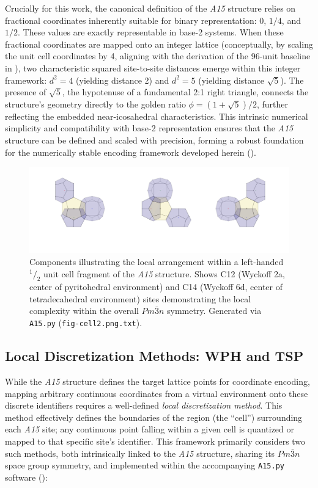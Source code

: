 \documentclass[10pt]{article}
\def\AAAB{\textit{A15}}
\begin{document}
Crucially for this work, the canonical definition of the \AAAB{} structure relies on fractional coordinates inherently suitable for binary representation: $0$, $1/4$, and $1/2$. These values are exactly representable in base-2 systems. When these fractional coordinates are mapped onto an integer lattice (conceptually, by scaling the unit cell coordinates by 4, aligning with the derivation of the 96-unit baseline in ), two characteristic squared site-to-site distances emerge within this integer framework: $d^2 = 4$ (yielding distance 2) and $d^2 = 5$ (yielding distance $\sqrt{5}$). The presence of $\sqrt{5}$, the hypotenuse of a fundamental 2:1 right triangle, connects the structure's geometry directly to the golden ratio $\phi = (1+\sqrt{5})/2$, further reflecting the embedded near-icosahedral characteristics. This intrinsic numerical simplicity and compatibility with base-2 representation ensures that the \AAAB{} structure can be defined and scaled with precision, forming a robust foundation for the numerically stable encoding framework developed herein ().

\begin{figure}[!ht]
    \capstart
    \centering
    \includegraphics[trim={25 50 25 0}, scale=0.55]{fig-cell2}
    \caption{Components illustrating the local arrangement within a left-handed $^1/_2$ unit cell fragment of the \AAAB{} structure. Shows C12 (Wyckoff 2a, center of pyritohedral environment) and C14 (Wyckoff 6d, center of tetradecahedral environment) sites demonstrating the local complexity within the overall $Pm\bar{3}n$ symmetry. Generated via \texttt{A15.py} (\texttt{fig-cell2.png.txt}).}
    \label{fig:cell2}
\end{figure}

\subsection{Local Discretization Methods: WPH and TSP}\label{subsec:intro-partitioning}

While the \AAAB{} structure defines the target lattice points for coordinate encoding, mapping arbitrary continuous coordinates from a virtual environment onto these discrete identifiers requires a well-defined \emph{local discretization method}. This method effectively defines the boundaries of the region (the ``cell'') surrounding each \AAAB{} site; any continuous point falling within a given cell is quantized or mapped to that specific site's identifier. This framework primarily considers two such methods, both intrinsically linked to the \AAAB{} structure, sharing its $Pm\bar{3}n$ space group symmetry, and implemented within the accompanying \texttt{A15.py} software ():
\end{document}
